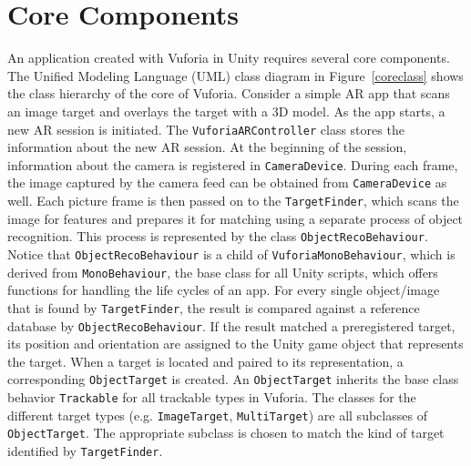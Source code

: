 \section{Core Components}
\begin{figure}[!ht]
\end{figure}

An application created with Vuforia in Unity requires several core components. The Unified Modeling Language (UML) class diagram in Figure~\ref{coreclass} shows the class hierarchy of the core of Vuforia. Consider a simple AR app that scans an image target and overlays the target with a 3D model. As the app starts, a new AR session is initiated. The \texttt{VuforiaARController} class stores the information about the new AR session. At the beginning of the session, information about the camera is registered in \texttt{CameraDevice}. During each frame, the image captured by the camera feed can be obtained from \texttt{CameraDevice} as well. Each picture frame is then passed on to the \texttt{TargetFinder}, which scans the image for features and prepares it for matching using a separate process of object recognition. This process is represented by the class \texttt{ObjectRecoBehaviour}. Notice that \texttt{ObjectRecoBehaviour} is a child of \texttt{VuforiaMonoBehaviour}, which is derived from \texttt{MonoBehaviour}, the base class for all Unity scripts, which offers functions for handling the life cycles of an app. For every single object/image that is found by \texttt{TargetFinder}, the result is compared against a reference database by \texttt{ObjectRecoBehaviour}. If the result matched a preregistered target, its position and orientation are assigned to the Unity game object that represents the target. When a target is located and paired to its representation, a corresponding \texttt{ObjectTarget} is created. An \texttt{ObjectTarget} inherits the base class behavior \texttt{Trackable} for all trackable types in Vuforia. The classes for the different target types (e.g. \texttt{ImageTarget}, \texttt{MultiTarget}) are all subclasses of  \texttt{ObjectTarget}. The appropriate subclass is chosen to match the kind of target identified by \texttt{TargetFinder}.

